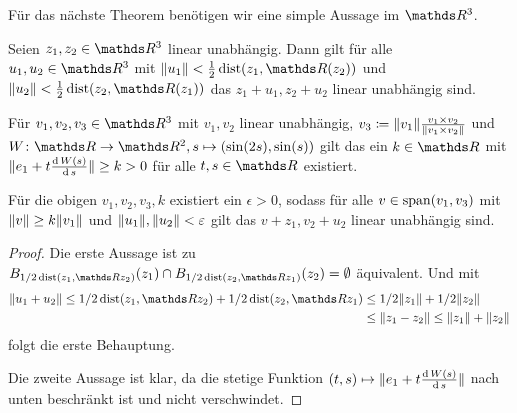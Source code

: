 Für das nächste Theorem benötigen wir eine simple Aussage im $ \R^3 $.
\begin{Lem}\label{lem:hilfSmaleHirsch}
	Seien $ z_1,z_2\in\R^3 $ linear unabhängig. Dann gilt für alle
	$ u_1,u_2\in\R^3 $ mit $ \norm{u_1} < \frac{1}{2}\dist(z_1,\R(z_2)) $
	und $ \norm{u_2}<\frac{1}{2}\dist(z_2,\R(z_1)) $ das $ z_1+u_1,z_2+u_2 $
	linear unabhängig sind.
	
	Für $ v_1,v_2,v_3\in\R^3 $ mit $ v_1,v_2 $ linear unabhängig,
	$ v_3 \coloneqq \lVert v_1\rVert \frac{v_1\times v_2}{\lVert v_1\times v_2\rVert}$ 
	und $ \abb{W}{\R}{\R^2}, s\mapsto (\sin(2s),\sin(s)) $ gilt das ein $ k\in\R $
	mit $ \lVert e_1 + t \frac{\operatorname{d} W(s)}{\operatorname{d} s}\rVert \geq k > 0 $ für alle $ t,s\in\R $
	existiert.
	
	Für die obigen $ v_1,v_2,v_3,k $ existiert ein $ \epsilon >0 $, sodass
	für alle $ v\in\operatorname{span}(v_1,v_3) $ mit $ \lVert v\rVert \geq k\lVert v_1\rVert $ und $ \lVert u_1\rVert,\lVert u_2\rVert <\varepsilon $ gilt das $ v+z_1, v_2+u_2 $ linear
	unabhängig sind.
	\begin{proof}
		Die erste Aussage ist zu $ B_{1/2 \dist(z_1,\R z_2)}(z_1) \cap  B_{1/2\dist(z_2,\R z_1)}(z_2) = \emptyset $ äquivalent. Und mit
		\begin{align*}
			\norm{u_1+u_2} \leq 1/2 \dist(z_1,\R z_2) + 1/2 \dist(z_2,\R z_1)
			&\leq 1/2 \norm{z_1} + 1/2 \norm{z_2} \\
			&\leq \norm{z_1 - z_2} \leq \norm{z_1} + \norm{z_2}
		\end{align*}
		folgt die erste Behauptung.
		
		Die zweite Aussage ist klar, da die stetige Funktion $ (t,s) \mapsto \lVert e_1 + t \frac{\operatorname{d} W(s)}{\operatorname{d} s}\rVert $ nach unten beschränkt ist und
		nicht verschwindet.
	\end{proof}
\end{Lem}

